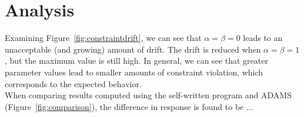 \documentclass{article}
\begin{document}
\section*{Analysis}
Examining Figure~\ref*{fig:constraintdrift}, we can see that $\alpha = \beta = 0$ leads to an unacceptable (and growing) amount of drift. The drift is reduced when $\alpha = \beta = 1$, but the maximum value is still high. In general, we can see that greater parameter values lead to smaller amounts of constraint violation, which corresponds to the expected behavior.\\

When comparing results computed using the self-written program and ADAMS (Figure~\ref*{fig:comparison}), the difference in response is found to be ...
\end{document}
